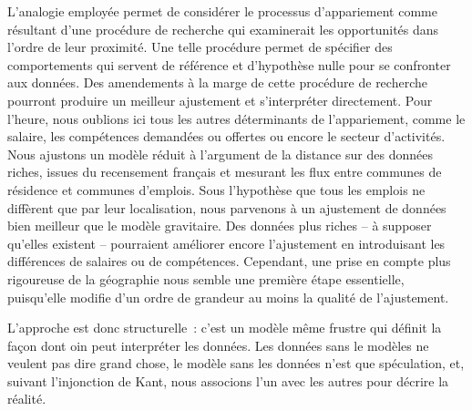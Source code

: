 \documentclass[
  10pt,
  a4paper,
  numbers=noendperiod,
  DIV=9]{scrartcl}
\begin{document}
L'analogie employée permet de considérer le processus d'appariement
comme résultant d'une procédure de recherche qui examinerait les
opportunités dans l'ordre de leur proximité. Une telle procédure permet
de spécifier des comportements qui servent de référence et d'hypothèse
nulle pour se confronter aux données. Des amendements à la marge de
cette procédure de recherche pourront produire un meilleur ajustement et
s'interpréter directement. Pour l'heure, nous oublions ici tous les
autres déterminants de l'appariement, comme le salaire, les compétences
demandées ou offertes ou encore le secteur d'activités. Nous ajustons un
modèle réduit à l'argument de la distance sur des données riches, issues
du recensement français et mesurant les flux entre communes de résidence
et communes d'emplois. Sous l'hypothèse que tous les emplois ne
diffèrent que par leur localisation, nous parvenons à un ajustement de
données bien meilleur que le modèle gravitaire. Des données plus riches
-- à supposer qu'elles existent -- pourraient améliorer encore
l'ajustement en introduisant les différences de salaires ou de
compétences. Cependant, une prise en compte plus rigoureuse de la
géographie nous semble une première étape essentielle, puisqu'elle
modifie d'un ordre de grandeur au moins la qualité de l'ajustement.

L'approche est donc structurelle~: c'est un modèle même frustre qui
définit la façon dont oin peut interpréter les données. Les données sans
le modèles ne veulent pas dire grand chose, le modèle sans les données
n'est que spéculation, et, suivant l'injonction de Kant, nous associons
l'un avec les autres pour décrire la réalité.
\end{document}
